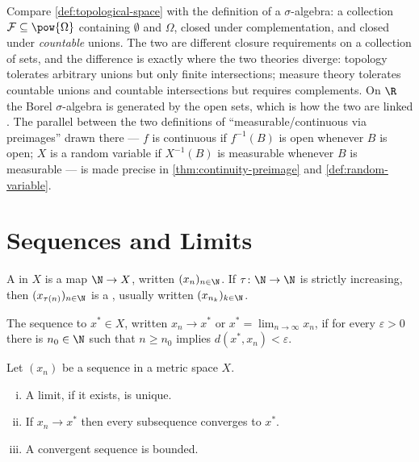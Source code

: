 \begin{remark}\label{rem:topology-sigma-algebra}
	Compare \autoref{def:topological-space} with the definition of a
	$\sigma$-algebra: a collection $\mathcal{F}\subseteq\pow{\Omega}$ containing
	$\emptyset$ and $\Omega$, closed under complementation, and closed under
	\emph{countable} unions. The two are different closure requirements on a
	collection of sets, and the difference is exactly where the two theories
	diverge: topology tolerates arbitrary unions but only finite intersections;
	measure theory tolerates countable unions and countable intersections but
	requires complements. On $\R$ the Borel $\sigma$-algebra is generated by the
	open sets, which is how the two are linked
	\autocite[slide 37]{fukuda2026analysis}. The parallel between the two
	definitions of ``measurable/continuous via preimages'' drawn there ---
	$f$ is continuous if $f^{-1}(B)$ is open whenever $B$ is open; $X$ is a random
	variable if $X^{-1}(B)$ is measurable whenever $B$ is measurable --- is made
	precise in \autoref{thm:continuity-preimage} and
	\autoref{def:random-variable}.
\end{remark}

\section{Sequences and Limits}\label{sec:top-sequences}

\begin{definition}\label{def:sequence}
	A  in $X$ is a map $\N\to X$, written $(x_n)_{n\in\N}$. If
	$\tau\colon\N\to\N$ is strictly increasing, then $(x_{\tau(n)})_{n\in\N}$ is a
	, usually written $(x_{n_k})_{k\in\N}$.

	The sequence  to $x^\ast\in X$, written
	$x_n\to x^\ast$ or $x^\ast=\lim_{n\to\infty}x_n$, if for every $\varepsilon>0$
	there is $n_0\in\N$ such that $n\geq n_0$ implies $d(x^\ast,x_n)<\varepsilon$.
\end{definition}

\begin{proposition}\label{prop:sequence-basics}
	Let $(x_n)$ be a sequence in a metric space $X$.
	\begin{enumerate}[(i)]
		\item A limit, if it exists, is unique.
		\item If $x_n\to x^\ast$ then every subsequence converges to $x^\ast$.
		\item A convergent sequence is bounded.
	\end{enumerate}
\end{proposition}

